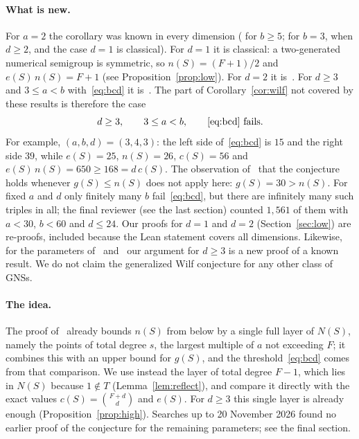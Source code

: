\documentclass[11pt]{article}
\theoremstyle{definition}
\theoremstyle{remark}
\begin{document}
\paragraph{What is new.}
For $a=2$ the corollary was known in every dimension
(\cite[Proposition~4.8]{cn} for $b\ge5$; for $b=3$, \cite[Theorem~3.10]{cn}
when $d\ge2$, and the case $d=1$ is classical). For $d=1$ it is classical: a
two-generated numerical semigroup is symmetric, so $n(S)=(F+1)/2$ and
$e(S)\,n(S)=F+1$ (see Proposition~\ref{prop:low}). For $d=2$ it
is~\cite[Theorem~5.5]{bcd}. For $d\ge3$ and $3\le a<b$ with~\eqref{eq:bcd} it
is~\cite[Theorem~5.6]{bcd}. The part of Corollary~\ref{cor:wilf} not covered by
these results is therefore the case
\[
d\ge3,\qquad 3\le a<b,\qquad \text{\eqref{eq:bcd} fails}.
\]
For example, $(a,b,d)=(3,4,3)$: the left side of~\eqref{eq:bcd} is $15$ and the
right side $39$, while $e(S)=25$, $n(S)=26$, $c(S)=56$ and
$e(S)\,n(S)=650\ge168=d\,c(S)$. The observation of~\cite[§5]{bcd} that the
conjecture holds whenever $g(S)\le n(S)$ does not apply here: $g(S)=30>n(S)$.
For fixed $a$ and $d$ only finitely many $b$
fail~\eqref{eq:bcd}, but there are infinitely many such triples in all; the final
reviewer (see the last section) counted $1{,}561$ of them with $a<30$, $b<60$ and
$d\le24$. Our proofs for $d=1$ and $d=2$ (Section~\ref{sec:low}) are re-proofs,
included because the Lean statement covers all dimensions. Likewise, for the
parameters of~\cite[Proposition~4.8]{cn} and~\cite[Theorem~5.6]{bcd} our
argument for $d\ge3$ is a new proof of a known result. We do not claim the
generalized Wilf conjecture for any other class of GNSs.

\paragraph{The idea.}
The proof of~\cite[Theorem~5.6]{bcd} already bounds $n(S)$ from below by a
single full layer of $N(S)$, namely the points of total degree $s$, the largest
multiple of $a$ not exceeding $F$; it combines this with an upper bound for
$g(S)$, and the threshold~\eqref{eq:bcd} comes from that comparison. We use
instead the layer of total degree $F-1$, which lies in $N(S)$ because $1\notin T$
(Lemma~\ref{lem:reflect}), and compare it directly with the exact values
$c(S)=\binom{F+d}{d}$ and $e(S)$. For $d\ge3$ this single layer is already
enough (Proposition~\ref{prop:high}). Searches up to 20 November 2026 found no
earlier proof of the conjecture for the remaining parameters; see the final
section.
\end{document}
